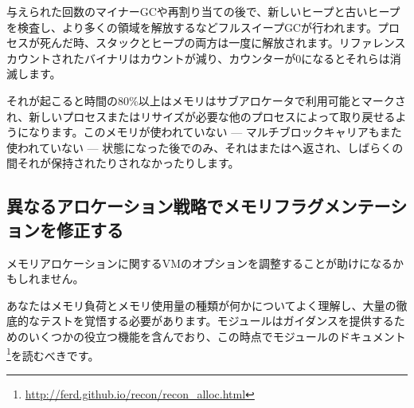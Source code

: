 与えられた回数のマイナーGCや再割り当ての後で、新しいヒープと古いヒープを検査し、より多くの領域を解放するなどフルスイープGCが行われます。プロセスが死んだ時、スタックとヒープの両方は一度に解放されます。リファレンスカウントされたバイナリはカウントが減り、カウンターが0になるとそれらは消滅します。

それが起こると時間の80\%以上はメモリはサブアロケータで利用可能とマークされ、新しいプロセスまたはリサイズが必要な他のプロセスによって取り戻せるようになります。このメモリが使われていない --- マルチブロックキャリアもまた使われていない --- 状態になった後でのみ、それはまたはへ返され、しばらくの間それが保持されたりされなかったりします。

\subsection{異なるアロケーション戦略でメモリフラグメンテーションを修正する}

メモリアロケーションに関するVMのオプションを調整することが助けになるかもしれません。

あなたはメモリ負荷とメモリ使用量の種類が何かについてよく理解し、大量の徹底的なテストを覚悟する必要があります。モジュールはガイダンスを提供するためのいくつかの役立つ機能を含んでおり、この時点でモジュールのドキュメント\footnote{\href{http://ferd.github.io/recon/recon\_alloc.html}{http://ferd.github.io/recon/recon\_alloc.html}}を読むべきです。

